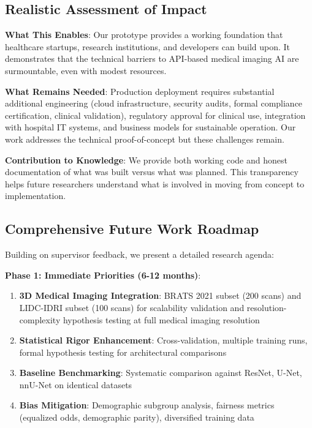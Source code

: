 \documentclass[12pt,a4paper]{article}
\begin{document}
\subsection{Realistic Assessment of Impact}

\textbf{What This Enables}: Our prototype provides a working foundation that healthcare startups, research institutions, and developers can build upon. It demonstrates that the technical barriers to API-based medical imaging AI are surmountable, even with modest resources.

\textbf{What Remains Needed}: Production deployment requires substantial additional engineering (cloud infrastructure, security audits, formal compliance certification, clinical validation), regulatory approval for clinical use, integration with hospital IT systems, and business models for sustainable operation. Our work addresses the technical proof-of-concept but these challenges remain.

\textbf{Contribution to Knowledge}: We provide both working code and honest documentation of what was built versus what was planned. This transparency helps future researchers understand what is involved in moving from concept to implementation.

\subsection{Comprehensive Future Work Roadmap}

Building on supervisor feedback, we present a detailed research agenda:

\textbf{Phase 1: Immediate Priorities (6-12 months)}:
\begin{enumerate}
    \item \textbf{3D Medical Imaging Integration}: BRATS 2021 subset (200 scans) and LIDC-IDRI subset (100 scans) for scalability validation and resolution-complexity hypothesis testing at full medical imaging resolution
    \item \textbf{Statistical Rigor Enhancement}: Cross-validation, multiple training runs, formal hypothesis testing for architectural comparisons
    \item \textbf{Baseline Benchmarking}: Systematic comparison against ResNet, U-Net, nnU-Net on identical datasets
    \item \textbf{Bias Mitigation}: Demographic subgroup analysis, fairness metrics (equalized odds, demographic parity), diversified training data
\end{enumerate}
\end{document}
